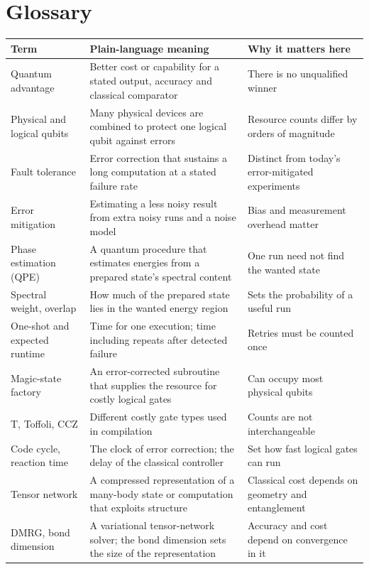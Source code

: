 \documentclass[10pt,a4paper]{article}
\begin{document}
\section{Glossary}
\label{app:glossary}
{\small
\begin{longtable}{@{}L{3.4cm} L{7.1cm} L{5.2cm}@{}}
\toprule Term & Plain-language meaning & Why it matters here\\ \midrule\endhead
\bottomrule\endfoot
Quantum advantage & Better cost or capability for a stated output, accuracy and classical comparator & There is no unqualified winner\\
Physical and logical qubits & Many physical devices are combined to protect one logical qubit against errors & Resource counts differ by orders of magnitude\\
Fault tolerance & Error correction that sustains a long computation at a stated failure rate & Distinct from today's error-mitigated experiments\\
Error mitigation & Estimating a less noisy result from extra noisy runs and a noise model & Bias and measurement overhead matter\\
Phase estimation (QPE) & A quantum procedure that estimates energies from a prepared state's spectral content & One run need not find the wanted state\\
Spectral weight, overlap & How much of the prepared state lies in the wanted energy region & Sets the probability of a useful run\\
One-shot and expected runtime & Time for one execution; time including repeats after detected failure & Retries must be counted once\\
Magic-state factory & An error-corrected subroutine that supplies the resource for costly logical gates & Can occupy most physical qubits\\
T, Toffoli, CCZ & Different costly gate types used in compilation & Counts are not interchangeable\\
Code cycle, reaction time & The clock of error correction; the delay of the classical controller & Set how fast logical gates can run\\
Tensor network & A compressed representation of a many-body state or computation that exploits structure & Classical cost depends on geometry and entanglement\\
DMRG, bond dimension & A variational tensor-network solver; the bond dimension sets the size of the representation & Accuracy and cost depend on convergence in it\\

\end{longtable}}
\end{document}
